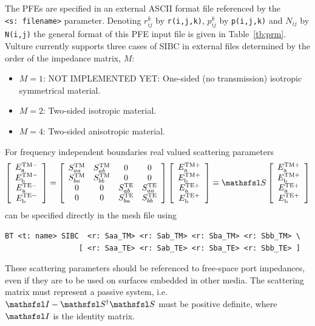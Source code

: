 \documentclass[onecolumn,a4paper]{article}
\numberwithin{equation}{section}
\begin{document}
The PFEs are specified in an external ASCII format file 
referenced by the \texttt{<s:~filename>} parameter. Denoting $r^k_{ij}$ by 
\texttt{r(i,j,k)}, $p^k_{ij}$ by \texttt{p(i,j,k)} and
$N_{ij}$ by \texttt{N(i,j)} the general format of this PFE input file is
given in Table~\ref{tb:prm}. Vulture currently supports three cases of SIBC
in external files determined by the order of the impedance matrix, $M$:
\begin{itemize}
 \item $M=1$: {\color{red} NOT IMPLEMENTED YET: One-sided (no transmission) isotropic symmetrical material}.
 \item $M=2$: Two-sided isotropic material.
 \item $M=4$: Two-sided anisotropic material.
\end{itemize}
For frequency independent boundaries real valued scattering
parameters
\begin{eqnarray}
\left[
\begin{array}{c}
E^\mathrm{TM-}_\mathrm{a} \\
E^\mathrm{TM-}_\mathrm{b} \\
E^\mathrm{TE-}_\mathrm{a} \\
E^\mathrm{TE-}_\mathrm{b}
\end{array}
\right]
=
\left[
\begin{array}{cccc}
S^\mathrm{TM}_{aa} &S^\mathrm{TM}_{ab} &0 & 0 \\
S^\mathrm{TM}_{ba} &S^\mathrm{TM}_{bb} &0 & 0 \\
0 & 0 &S^\mathrm{TE}_{ab} &S^\mathrm{TE}_{aa} \\
0 & 0 &S^\mathrm{TE}_{ba} &S^\mathrm{TE}_{bb}
\end{array}
\right]
\left[
\begin{array}{c}
E^\mathrm{TM+}_\mathrm{a} \\
E^\mathrm{TM+}_\mathrm{b} \\
E^\mathrm{TE+}_\mathrm{a} \\
E^\mathrm{TE+}_\mathrm{b}
\end{array}
\right]
\equiv \mS
\left[
\begin{array}{c}
E^\mathrm{TM+}_\mathrm{a} \\
E^\mathrm{TM+}_\mathrm{b} \\
E^\mathrm{TE+}_\mathrm{a} \\
E^\mathrm{TE+}_\mathrm{b}
\end{array}
\right]
\end{eqnarray}
can be specified directly in the mesh file using
\begin{verbatim}
BT <t: name> SIBC  <r: Saa_TM> <r: Sab_TM> <r: Sba_TM> <r: Sbb_TM> \
                 [ <r: Saa_TE> <r: Sab_TE> <r: Sba_TE> <r: Sbb_TE> ]
\end{verbatim}
These scattering parameters should be referenced to free-space port impedances, even
if they are to be used on surfaces embedded in other media. The scattering matrix must
represent a passive system, i.e. $\mI - \mS^\dagger \mS$ must be positive definite,
where $\mI$ is the identity matrix.
\end{document}
